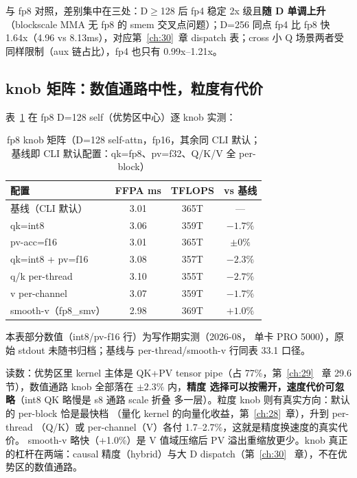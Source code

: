 与 fp8 对照，差别集中在三处：D$\ge$128 后 fp4 稳定 2x 级且\textbf{随 D
单调上升}（blockscale MMA 无 fp8 的 smem 交叉点问题）；D=256 同点
fp4 比 fp8 快 1.64x（4.96 vs 8.13ms），对应第~\ref{ch:30}~章 dispatch
表；cross 小 Q 场景两者受同样限制（aux 链占比），fp4 也只有 0.99x--1.21x。

\subsection{knob 矩阵：数值通路中性，粒度有代价}

表~\ref{tab:33-knobs} 在 fp8 D=128 self（优势区中心）逐 knob 实测：

\begin{table}[htbp]
  \centering\small
  \caption{fp8 knob 矩阵（D=128 self-attn，fp16，其余同 CLI 默认；
  基线即 CLI 默认配置：qk=fp8、pv=f32、Q/K/V 全 per-block）}
  \label{tab:33-knobs}
  \begin{tabular}{lccc}
    \toprule
    配置 & FFPA ms & TFLOPS & vs 基线 \\
    \midrule
    基线（CLI 默认）           & 3.01 & 365T & --- \\
    \quad qk=int8               & 3.06 & 359T & $-1.7\%$ \\
    \quad pv-acc=f16            & 3.01 & 365T & $\pm0\%$ \\
    \quad qk=int8 + pv=f16      & 3.08 & 357T & $-2.3\%$ \\
    \quad q/k per-thread        & 3.10 & 355T & $-2.7\%$ \\
    \quad v per-channel         & 3.07 & 359T & $-1.7\%$ \\
    \quad smooth-v（fp8\_smv）  & 2.98 & 369T & $+1.0\%$ \\
    \bottomrule
  \end{tabular}

  \par\vspace{4pt}
  {\footnotesize 本表部分数值（int8/pv-f16 行）为写作期实测（2026-08，
  单卡 PRO 5000），原始 stdout 未随书归档；基线与 per-thread/smooth-v
  行同表 33.1 口径。\par}
\end{table}

读数：优势区里 kernel 主体是 QK+PV tensor pipe（占 77\%，第~\ref{ch:29}~
章 29.6 节），数值通路 knob 全部落在 $\pm2.3\%$ 内，\textbf{精度
选择可以按需开，速度代价可忽略}（int8 QK 略慢是 s8 通路 scale 折叠
多一层）。粒度 knob 则有真实方向：默认的 per-block 恰是最快档
（量化 kernel 的向量化收益，第~\ref{ch:28}~章），升到 per-thread
（Q/K）或 per-channel（V）各付 1.7--2.7\%，这就是精度换速度的真实代价。
smooth-v 略快（+1.0\%）是 V 值域压缩后 PV 溢出重缩放更少。knob 真正
的杠杆在两端：causal 精度（hybrid）与大 D dispatch（第~\ref{ch:30}~
章），不在优势区的数值通路。

